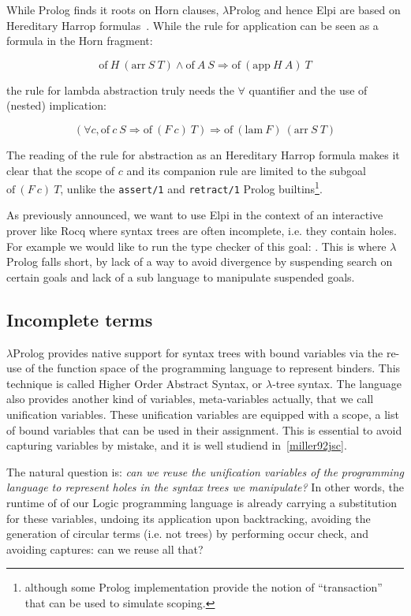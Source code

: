 \documentclass[a4paper, 11pt]{book}
\begin{document}
While Prolog finds it roots on Horn clauses, $\lambda$Prolog and hence
Elpi are based on Hereditary Harrop formulas~\cite{Miller_Nadathur_2012}.
While the rule for application
can be seen as a formula in the Horn fragment:

$$
\mathrm{of}~ H~(\mathrm{arr}~S~T) \land \mathrm{of}~A~S \Rightarrow \mathrm{of}~(\mathrm{app}~H~A)~T
$$

\noindent the rule for lambda abstraction truly needs the $\forall$ quantifier
and the use of (nested) implication:

$$
(\forall c, \mathrm{of}~c~S \Rightarrow  \mathrm{of}~(F~c)~T) \Rightarrow \mathrm{of}~(\mathrm{lam}~F)~(\mathrm{arr}~S~T)
$$

The reading of the rule for abstraction as an Hereditary Harrop formula
makes it clear that the scope of $c$ and its companion rule
are limited to the subgoal $\mathrm{of}~(F~c)~T$,
unlike the \texttt{assert/1} and \texttt{retract/1} Prolog builtins\footnote{
  although some Prolog implementation provide the notion of ``transaction''
that can be used to simulate scoping.}.

As previously announced, we want to use Elpi in the context of an
interactive prover like Rocq where syntax trees are often incomplete, i.e.
they contain holes. For example we would like to run the
type checker of this goal: .
This is where $\lambda$Prolog falls short, by lack of a way to avoid
divergence by suspending search on certain goals and lack of a sub language
to manipulate suspended goals.


\subsection{Incomplete terms}

$\lambda$Prolog provides native support for syntax trees with bound
variables via the re-use of the function space of the programming language
to represent binders. This technique is called Higher Order Abstract Syntax,
or $\lambda$-tree syntax. The language also provides another kind
of variables, meta-variables actually, that we call unification variables.
These unification variables are equipped with a scope, a list of bound
variables that can be used in their assignment. This is essential to
avoid capturing variables by mistake, and it is well studiend in~\ref{miller92jsc}.

The natural question is: \emph{can we reuse the unification variables of
the programming language to represent holes in the syntax trees we manipulate?}
In other words, the runtime of of our Logic programming language is already
carrying a substitution for these variables, undoing its application upon
backtracking, avoiding the generation of circular terms (i.e. not trees)
by performing occur check, and avoiding captures: can we reuse all that?
\end{document}
